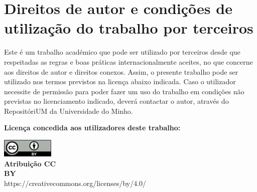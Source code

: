 
\chapter*{Direitos de autor e condi\c c\~oes de utiliza\c c\~ao do trabalho por terceiros}

Este \'e um trabalho acad\'emico que pode ser utilizado por terceiros desde que respeitadas as regras e boas pr\'aticas internacionalmente aceites, no que concerne aos direitos de autor e direitos conexos.
Assim, o presente trabalho pode ser utilizado nos termos previstos na licen\c ca abaixo indicada.
Caso o utilizador necessite de permiss\~ao para poder fazer um uso do trabalho em condi\c c\~oes n\~ao previstas no licenciamento indicado, dever\'a contactar o autor, atrav\'es do Reposit\'oriUM da Universidade do Minho.

\vspace{0.5cm}

\noindent \textbf{Licen\c ca concedida aos utilizadores deste trabalho:} 

\vspace{0.5cm}

\noindent \includegraphics[width=2.5cm]{preamble/creative_commons/by.png}\\
\noindent \textbf{Atribui\c c\~ao CC}\\
\noindent \textbf{BY}\\
\noindent https://creativecommons.org/licenses/by/4.0/


